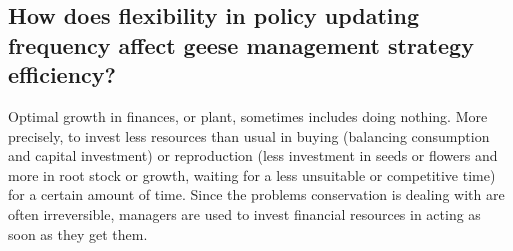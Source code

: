 \documentclass[12pt,a4paper]{article}
\begin{document}
\subsection{How does flexibility in policy updating frequency affect geese management strategy efficiency?}
Optimal growth in finances, or plant, sometimes includes doing nothing.
More precisely, to invest less resources than usual in buying (balancing consumption and capital investment) or reproduction (less investment in seeds or flowers and more in root stock or growth, waiting for a less unsuitable or competitive time) for a certain amount of time.
Since the problems conservation is dealing with are often irreversible, managers are used to invest financial resources in acting as soon as they get them.
\end{document}
